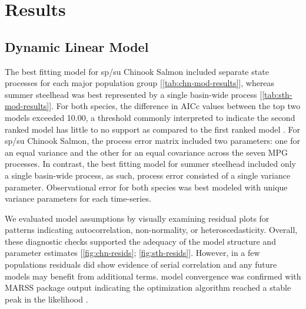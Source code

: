 \documentclass[10pt,a4paper]{article}
\begin{document}
\section{Results}\label{results}

\subsection{Dynamic Linear Model}\label{dynamic-linear-model-1}

The best fitting model for sp/su Chinook Salmon included separate state processes for each major population group {[}\ref{tab:chn-mod-results}{]}, whereas summer steelhead was best represented by a single basin-wide process {[}\ref{tab:sth-mod-results}{]}. For both species, the difference in AICc values between the top two models exceeded 10.00, a threshold commonly interpreted to indicate the second ranked model has little to no support as compared to the first ranked model \autocite{burnham_multimodel_2004}. For sp/su Chinook Salmon, the process error matrix included two parameters: one for an equal variance and the other for an equal covariance across the seven MPG processes. In contrast, the best fitting model for summer steelhead included only a single basin-wide process, as such, process error consisted of a single variance parameter. Observational error for both species was best modeled with unique variance parameters for each time-series.

We evaluated model assumptions by visually examining residual plots for patterns indicating autocorrelation, non-normality, or heteroscedasticity. Overall, these diagnostic checks supported the adequacy of the model structure and parameter estimates {[}\ref{fig:chn-resids}; \ref{fig:sth-resids}{]}. However, in a few populations residuals did show evidence of serial correlation and any future models may benefit from additional terms. model convergence was confirmed with MARSS package output indicating the optimization algorithm reached a stable peak in the likelihood \autocite{holmes_2021}.
\end{document}
